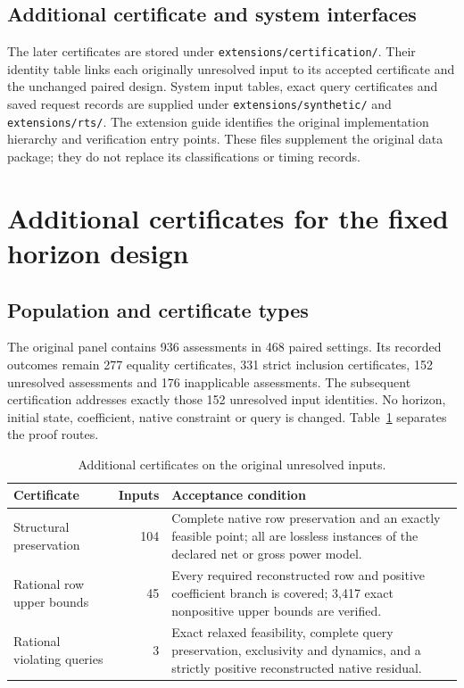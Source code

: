 \subsection{Additional certificate and system interfaces}
The later certificates are stored under \texttt{extensions/certification/}.
Their identity table links each originally unresolved input to its accepted
certificate and the unchanged paired design. System input tables, exact
query certificates and saved request records are supplied under
\texttt{extensions/synthetic/} and \texttt{extensions/rts/}. The extension guide
identifies the original implementation hierarchy and verification entry
points. These files supplement the original data package; they do not
replace its classifications or timing records.


\section{Additional certificates for the fixed horizon design}
\label{sec:sat_certificate_followup}

\subsection{Population and certificate types}
The original panel contains 936 assessments in 468 paired settings. Its
recorded outcomes remain 277 equality certificates, 331 strict inclusion
certificates, 152 unresolved assessments and 176 inapplicable assessments.
The subsequent certification addresses exactly those 152 unresolved input identities.
No horizon, initial state, coefficient, native constraint or query is
changed. Table~\ref{tab:sat_certificate_types} separates the proof routes.

\begin{table}[htbp]
\caption{Additional certificates on the original unresolved inputs.}
\label{tab:sat_certificate_types}
\begin{tabularx}{\linewidth}{@{}p{.27\linewidth}rX@{}}\toprule
Certificate & Inputs & Acceptance condition\\\midrule
Structural preservation & 104 & Complete native row preservation and an exactly feasible point; all are lossless instances of the declared net or gross power model.\\
Rational row upper bounds & 45 & Every required reconstructed row and positive coefficient branch is covered; 3,417 exact nonpositive upper bounds are verified.\\
Rational violating queries & 3 & Exact relaxed feasibility, complete query preservation, exclusivity and dynamics, and a strictly positive reconstructed native residual.\\\bottomrule
\end{tabularx}
\end{table}



